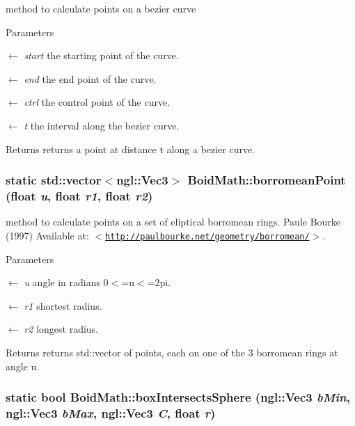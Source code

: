 method to calculate points on a bezier curve 
\begin{DoxyParams}{Parameters}
\item[\mbox{$\leftarrow$} {\em start}]the starting point of the curve. \item[\mbox{$\leftarrow$} {\em end}]the end point of the curve. \item[\mbox{$\leftarrow$} {\em ctrl}]the control point of the curve. \item[\mbox{$\leftarrow$} {\em t}]the interval along the bezier curve. \end{DoxyParams}
\begin{DoxyReturn}{Returns}
returns a point at distance t along a bezier curve. 
\end{DoxyReturn}
\hypertarget{classBoidMath_a933eefc38fd6e377f5de824f4af92f14}{
\subsubsection[{borromeanPoint}]{\setlength{\rightskip}{0pt plus 5cm}static std::vector$<$ngl::Vec3$>$ BoidMath::borromeanPoint (float {\em u}, \/  float {\em r1}, \/  float {\em r2})}}
\label{classBoidMath_a933eefc38fd6e377f5de824f4af92f14}


method to calculate points on a set of eliptical borromean rings. Paule Bourke (1997) Available at: $<$\href{http://paulbourke.net/geometry/borromean/}{\tt http://paulbourke.net/geometry/borromean/}$>$. 
\begin{DoxyParams}{Parameters}
\item[\mbox{$\leftarrow$} {\em u}]angle in radians 0$<$=u$<$=2pi. \item[\mbox{$\leftarrow$} {\em r1}]shortest radius. \item[\mbox{$\leftarrow$} {\em r2}]longest radius. \end{DoxyParams}
\begin{DoxyReturn}{Returns}
returns std::vector of points, each on one of the 3 borromean rings at angle u. 
\end{DoxyReturn}
\hypertarget{classBoidMath_a1be18ef4f6d12c58cc4168ad0d814a28}{
\subsubsection[{boxIntersectsSphere}]{\setlength{\rightskip}{0pt plus 5cm}static bool BoidMath::boxIntersectsSphere (ngl::Vec3 {\em bMin}, \/  ngl::Vec3 {\em bMax}, \/  ngl::Vec3 {\em C}, \/  float {\em r})}}
\label{classBoidMath_a1be18ef4f6d12c58cc4168ad0d814a28}


